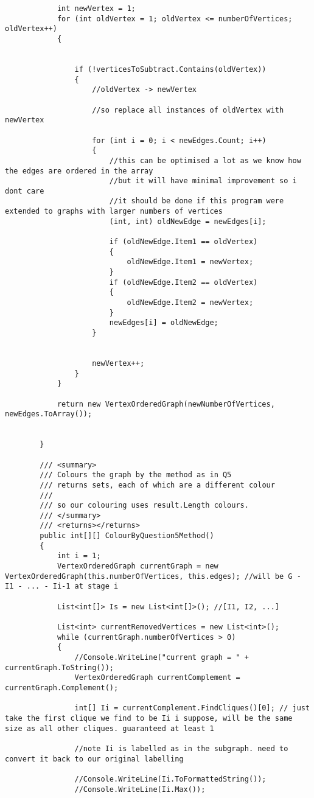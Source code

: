 \documentclass{article}
\begin{document}
\begin{lstlisting}
			int newVertex = 1;
			for (int oldVertex = 1; oldVertex <= numberOfVertices; oldVertex++)
			{
				
				
				if (!verticesToSubtract.Contains(oldVertex))
				{
					//oldVertex -> newVertex
					
					//so replace all instances of oldVertex with newVertex
					
					for (int i = 0; i < newEdges.Count; i++)
					{
						//this can be optimised a lot as we know how the edges are ordered in the array
						//but it will have minimal improvement so i dont care
						//it should be done if this program were extended to graphs with larger numbers of vertices
						(int, int) oldNewEdge = newEdges[i];
						
						if (oldNewEdge.Item1 == oldVertex)
						{
							oldNewEdge.Item1 = newVertex;
						}
						if (oldNewEdge.Item2 == oldVertex)
						{
							oldNewEdge.Item2 = newVertex;
						}
						newEdges[i] = oldNewEdge;
					}
					
					
					newVertex++;
				}
			}
			
			return new VertexOrderedGraph(newNumberOfVertices, newEdges.ToArray());
			
			
		}
		
		/// <summary>
		/// Colours the graph by the method as in Q5
		/// returns sets, each of which are a different colour
		/// 
		/// so our colouring uses result.Length colours.
		/// </summary>
		/// <returns></returns>
		public int[][] ColourByQuestion5Method()
		{
			int i = 1;
			VertexOrderedGraph currentGraph = new VertexOrderedGraph(this.numberOfVertices, this.edges); //will be G - I1 - ... - Ii-1 at stage i
			
			List<int[]> Is = new List<int[]>(); //[I1, I2, ...]
			
			List<int> currentRemovedVertices = new List<int>();
			while (currentGraph.numberOfVertices > 0)
			{
				//Console.WriteLine("current graph = " + currentGraph.ToString());
				VertexOrderedGraph currentComplement = currentGraph.Complement();
				
				int[] Ii = currentComplement.FindCliques()[0]; // just take the first clique we find to be Ii i suppose, will be the same size as all other cliques. guaranteed at least 1
				
				//note Ii is labelled as in the subgraph. need to convert it back to our original labelling
				
				//Console.WriteLine(Ii.ToFormattedString());
				//Console.WriteLine(Ii.Max());
				

\end{lstlisting}
\end{document}
